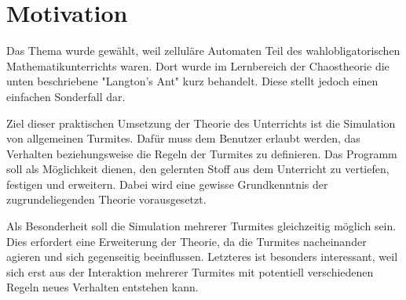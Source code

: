 \section{Motivation}
Das Thema wurde gewählt, weil zelluläre Automaten Teil des wahlobligatorischen Mathematikunterrichts waren. Dort wurde im Lernbereich der Chaostheorie die unten beschriebene "Langton's Ant" kurz behandelt. Diese stellt jedoch einen einfachen Sonderfall dar. 

Ziel dieser praktischen Umsetzung der Theorie des Unterrichts ist die Simulation von allgemeinen Turmites. Dafür muss dem Benutzer erlaubt werden, das Verhalten beziehungsweise die Regeln der Turmites zu definieren. Das Programm soll als Möglichkeit dienen, den gelernten Stoff aus dem Unterricht zu vertiefen, festigen und erweitern. Dabei wird eine gewisse Grundkenntnis der zugrundeliegenden Theorie vorausgesetzt.

Als Besonderheit soll die Simulation mehrerer Turmites gleichzeitig möglich sein. Dies erfordert eine Erweiterung der Theorie, da die Turmites nacheinander agieren und sich gegenseitig beeinflussen. Letzteres ist besonders interessant, weil sich erst aus der Interaktion mehrerer Turmites mit potentiell verschiedenen Regeln neues Verhalten entstehen kann.

